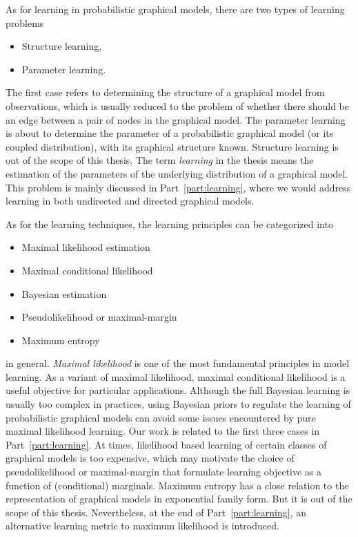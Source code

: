 As for learning in probabilistic graphical models, there are two types of learning problems
\begin{itemize}
\item Structure learning,
\item Parameter learning.
\end{itemize}
The first case refers to determining the structure of a graphical model from observations, which is usually reduced to the problem of whether there should be an edge between a pair of nodes in the graphical model. The parameter learning is about to determine the parameter of a probabilistic graphical model (or its coupled distribution), with its graphical structure known. Structure learning is out of the scope of this thesis. The term \textit{learning} in the thesis means the estimation of the parameters of the underlying distribution of a graphical model. This problem is mainly discussed in Part~\ref{part:learning}, where we would address learning in both undirected and directed graphical models. 


As for the learning techniques, the learning principles can be categorized into
\begin{itemize}
\item Maximal likelihood estimation
\item Maximal conditional likelihood
\item Bayesian estimation
\item Pseudolikelihood or maximal-margin
\item Maximum entropy
\end{itemize}
in general. \textit{Maximal likelihood} is one of the most fundamental principles in model learning. As a variant of maximal likelihood, maximal conditional likelihood is a useful objective for particular applications. Although the full Bayesian learning is usually too complex in practices, using Bayesian priors to regulate the learning of probabilistic graphical models can avoid some issues encountered by pure maximal likelihood learning.
Our work is related to the first three cases in Part~\ref{part:learning}. At times, likelihood based learning of certain classes of graphical models is too expensive, which may motivate the choice of pseudolikelihood or maximal-margin that formulate learning objective as a function of (conditional) marginals. Maximum entropy has a close relation to the representation of graphical models in exponential family form. But it is out of the scope of this thesis. Nevertheless, at the end of Part~\ref{part:learning}, an alternative learning metric to maximum likelihood is introduced.

